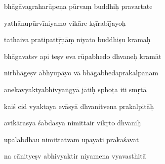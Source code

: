 \documentclass[article,12pt,a4paper]{memoir}%
\newcounter{parCount}
\begin{document}
	  
	  \pstart \leavevmode%
	bhāgāvagraharūpeṇa pūrvaṃ buddhiḥ pravartate 
	{}
	\pend%
      

	  
	  \pstart {} yathānupūrvīniyamo vikāre kṣīrabījayoḥ 
	{}
	\pend%
      

	  
	  \pstart \leavevmode%
	tathaiva pratipattṝṇāṃ niyato buddhiṣu kramaḥ 
	{}
	\pend%
      

	  
	  \pstart {} bhāgavatsv api teṣv eva rūpabhedo dhvaneḥ kramāt 
	{}
	\pend%
      

	  
	  \pstart \leavevmode%
	nirbhāgeṣv abhyupāyo vā bhāgabhedaprakalpanam 
	{}
	\pend%
      

	  
	  \pstart {} anekavyaktyabhivyaṅgyā jātiḥ sphoṭa iti smṛtā 
	{}
	\pend%
      

	  
	  \pstart \leavevmode%
	kaiś cid vyaktaya evāsyā dhvanitvena prakalpitāḥ 
	{}
	\pend%
      

	  
	  \pstart {} avikārasya śabdasya nimittair vikṛto dhvaniḥ 
	{}
	\pend%
      

	  
	  \pstart \leavevmode%
	upalabdhau nimittatvam upayāti prakāśavat 
	{}
	\pend%
      

	  
	  \pstart {} na cānityeṣv abhivyaktir niyamena vyavasthitā 
	{}
	\pend%
      
\end{document}
